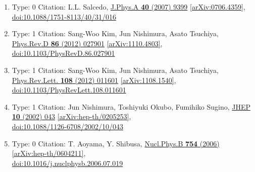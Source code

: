 \documentclass[a4paper,10pt]{article}
\begin{document}
\begin{enumerate}
\begin{enumerate}
  \item Type: 0 Citation: L.L. Salcedo, \href{https://www.doi.org/10.1088/1751-8113/40/31/016}{J.Phys.A {\bf 40} (2007) 9399}  \href{https://arxiv.org/abs/0706.4359}{[arXiv:0706.4359]},\\\href{https://www.doi.org/10.1088/1751-8113/40/31/016}{doi:10.1088/1751-8113/40/31/016}
  \item Type: 1 Citation: Sang-Woo Kim, Jun Nishimura, Asato Tsuchiya, \href{https://www.doi.org/10.1103/PhysRevD.86.027901}{Phys.Rev.D {\bf 86} (2012) 027901}  \href{https://arxiv.org/abs/1110.4803}{[arXiv:1110.4803]},\\\href{https://www.doi.org/10.1103/PhysRevD.86.027901}{doi:10.1103/PhysRevD.86.027901}
  \item Type: 1 Citation: Sang-Woo Kim, Jun Nishimura, Asato Tsuchiya, \href{https://www.doi.org/10.1103/PhysRevLett.108.011601}{Phys.Rev.Lett. {\bf 108} (2012) 011601}  \href{https://arxiv.org/abs/1108.1540}{[arXiv:1108.1540]},\\\href{https://www.doi.org/10.1103/PhysRevLett.108.011601}{doi:10.1103/PhysRevLett.108.011601}
  \item Type: 1 Citation: Jun Nishimura, Toshiyuki Okubo, Fumihiko Sugino, \href{https://www.doi.org/10.1088/1126-6708/2002/10/043}{JHEP {\bf 10} (2002) 043}  \href{https://arxiv.org/abs/hep-th/0205253}{[arXiv:hep-th/0205253]},\\\href{https://www.doi.org/10.1088/1126-6708/2002/10/043}{doi:10.1088/1126-6708/2002/10/043}
  \item Type: 0 Citation: T. Aoyama, Y. Shibusa, \href{https://www.doi.org/10.1016/j.nuclphysb.2006.07.019}{Nucl.Phys.B {\bf 754} (2006) }  \href{https://arxiv.org/abs/hep-th/0604211}{[arXiv:hep-th/0604211]},\\\href{https://www.doi.org/10.1016/j.nuclphysb.2006.07.019}{doi:10.1016/j.nuclphysb.2006.07.019}

\end{enumerate}
\end{enumerate}
\end{document}
